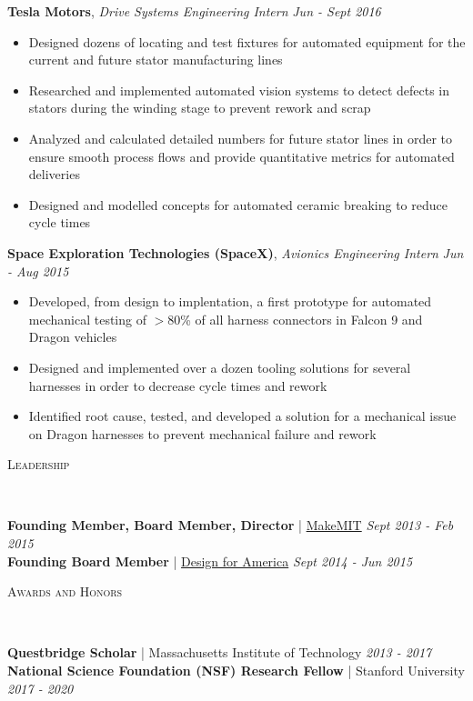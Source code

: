 \documentclass[9pt]{article}
\newenvironment{changemargin}[2]{%
  \begin{list}{}{%
    \setlength{\topsep}{0pt}%
    \setlength{\leftmargin}{#1}%
    \setlength{\rightmargin}{#2}%
    \setlength{\listparindent}{\parindent}%
    \setlength{\itemindent}{\parindent}%
    \setlength{\parsep}{\parskip}%
  }%
  \item[]}{\end{list}
}
\newcommand{\lineover}{
	\begin{changemargin}{-0.05in}{-0.05in}
		\vspace*{-8pt}
		\hrulefill \\
		\vspace*{-2pt}
	\end{changemargin}
}
\newcommand{\header}[1]{
	\begin{changemargin}{-0.5in}{-0.5in}
		\scshape{#1}\\
  	\lineover
	\end{changemargin}
}
\newcommand{\jobdescription}[1]{
	\begin{changemargin}{0.15in}{0.15in}
    \smallskip
		{#1}
    \medskip
	\end{changemargin}
}
\newcommand{\jobtitle}[3]{
	\textbf{#1}, \emph{#2} \hfill \emph{#3}\\
}
\newenvironment{body} {
	\vspace*{-16pt}
	\begin{changemargin}{-0.25in}{-0.5in}
  }	
	{\end{changemargin}
}
\begin{document}
\begin{body}
  \jobtitle{Tesla Motors}{Drive Systems Engineering Intern}{Jun - Sept 2016}
  \jobdescription{
  	\begin{itemize} \itemsep -0pt  %
  		\item Designed dozens of locating and test fixtures for automated equipment for the current and future stator manufacturing lines  		
  		\item Researched and implemented automated vision systems to detect defects in stators during the winding stage to prevent rework and scrap
  		\item Analyzed and calculated detailed numbers for future stator lines in order to ensure smooth process flows and provide quantitative metrics for automated deliveries
  		\item Designed and modelled concepts for automated ceramic breaking to reduce cycle times
  	\end{itemize}
  }

  \jobtitle{Space Exploration Technologies (SpaceX)}{Avionics Engineering Intern}{Jun - Aug 2015}
  \jobdescription{
  	\begin{itemize} \itemsep -0pt  %
  		\item Developed, from design to implentation, a first prototype for automated mechanical testing of $>$80\% of all harness connectors in Falcon 9 and Dragon vehicles
  		\item Designed and implemented over a dozen tooling solutions for several harnesses in order to decrease cycle times and rework
  		\item Identified root cause, tested, and developed a solution for a mechanical issue on Dragon harnesses to prevent mechanical failure and rework
  	\end{itemize}
  }
\end{body}
\smallskip
\header{Leadership}

\begin{body}
	\vspace{14pt}
	\textbf{Founding Member, Board Member, Director} | \href{https://makemit.org/}{MakeMIT} \hfill {} \emph{Sept 2013 - Feb 2015}\\
	\smallskip
	\textbf{Founding Board Member} | \href{http://edgerton.mit.edu/clubs-teams/design-america}{Design for America} \hfill{} \emph{Sept 2014 - Jun 2015}\\
\end{body}
\smallskip
\header{Awards and Honors}
\begin{body}
	\vspace{14pt}
	\textbf{Questbridge Scholar} | Massachusetts Institute of Technology \hfill{} \emph{2013 - 2017}\\
	\smallskip
	\textbf{National Science Foundation (NSF) Research Fellow} | Stanford University \hfill{} \emph{2017 - 2020}

\end{body}
\end{document}
